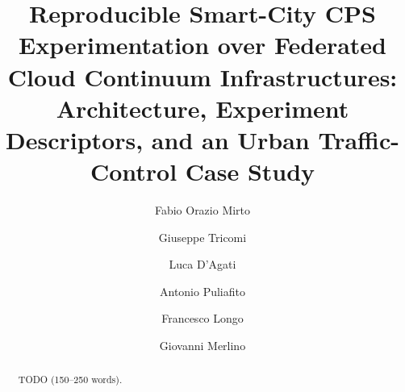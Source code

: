 \documentclass[runningheads]{llncs}
\begin{document}
\title{Reproducible Smart-City CPS Experimentation over Federated Cloud Continuum Infrastructures: Architecture, Experiment Descriptors, and an Urban Traffic-Control Case Study}
\author{Fabio Orazio Mirto \and Giuseppe Tricomi \and Luca D'Agati \and Antonio Puliafito \and Francesco Longo \and Giovanni Merlino}
\maketitle

\begin{abstract}
TODO (150--250 words).
\end{abstract}












\end{document}
